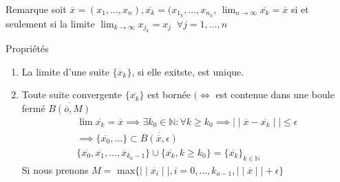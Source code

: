 \begin{parag}{Remarque}
    soit $ \overline{x} = (x_1, \dots, x_n), \overline{x_k} = (x_{1_k}, \dots, x_{n_k}$, $ \lim_{n \to \infty} \overline{x_k} = \overline{x}$ si et seulement si la limite  $ \lim_{k \to \infty}x_{j_k} = x_j \; \; \forall j= 1, \dots, n$ 

\end{parag}
\begin{parag}{Propriétés}
    \begin{enumerate}
        \item La limite d'une suite $\{ \overline{x}_k\}$, si elle exitste, est unique.
        \item Toute suite convergente $\{ \overline{x_k}\}$ est bornée
            $( \iff $ est contenue dans une boule fermé $ \overline{B( \overline{o}, M)}$
            \begin{align*}
                \lim \overline{x_k} = \overline{x} \implies \exists k_0 \in \mathbb{N}: \forall k \geq k_0 \implies \mid \mid \overline{x} - \overline{x_k} \mid \mid \leq \epsilon \\
                \implies \{ \overline{x_0}, \dots \} \subset \overline{B( \overline{x}, \epsilon)}\\
            \{ \overline{x_0}, \overline{x_1}, \dots, \overline{x}_{k_0-1}\} \cup \{ \overline{x_k}, k \geq k_0\} = \{ \overline{x_k}\}_{k \in \mathbb{N}}
            \end{align*}
            Si nous prenons $M = $ max$\{ \mid \mid \overline{x_i} \mid \mid, i = 0, \dots, k_{o-1}, \mid \mid \overline{x} \mid \mid   + \epsilon\}$
    \end{enumerate}
    

\end{parag}

